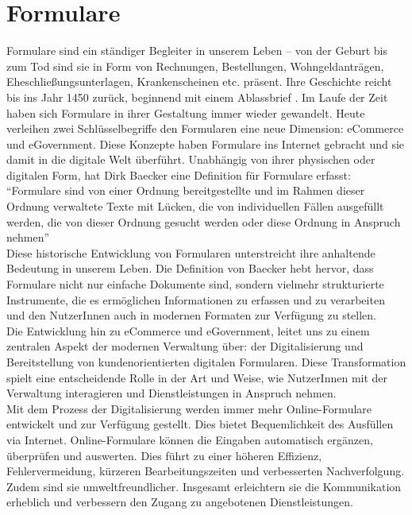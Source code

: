 \section{Formulare}

Formulare sind ein ständiger Begleiter in unserem Leben – von der Geburt bis zum Tod sind sie in Form von Rechnungen, Bestellungen, Wohngeldanträgen, Eheschließungsunterlagen, Krankenscheinen etc. präsent. Ihre Geschichte reicht bis ins Jahr 1450 zurück, beginnend mit einem Ablassbrief \citep{formulare_schwesinger_2007}. Im Laufe der Zeit haben sich Formulare in ihrer Gestaltung immer wieder gewandelt. Heute verleihen zwei Schlüsselbegriffe den Formularen eine neue Dimension: eCommerce und eGovernment. Diese Konzepte haben Formulare ins Internet gebracht und sie damit in die digitale Welt überführt. Unabhängig von ihrer physischen oder digitalen Form, hat Dirk Baecker \citep[S. ~3]{plener_formular_2021} eine Definition für Formulare erfasst: ``Formulare sind von einer Ordnung bereitgestellte und im Rahmen dieser Ordnung verwaltete Texte mit Lücken, die von individuellen Fällen ausgefüllt werden, die von dieser Ordnung gesucht werden oder diese Ordnung in Anspruch nehmen'' \\

Diese historische Entwicklung von Formularen unterstreicht ihre anhaltende Bedeutung in unserem Leben. Die Definition von Baecker hebt hervor, dass Formulare nicht nur einfache Dokumente sind, sondern vielmehr strukturierte Instrumente, die es ermöglichen Informationen zu erfassen und zu verarbeiten und den NutzerInnen auch in modernen Formaten zur Verfügung zu stellen.\\

Die Entwicklung hin zu eCommerce und eGovernment, leitet uns zu einem zentralen Aspekt der modernen Verwaltung über: der Digitalisierung und Bereitstellung von kundenorientierten digitalen Formularen. Diese Transformation spielt eine entscheidende Rolle in der Art und Weise, wie NutzerInnen mit der Verwaltung interagieren und Dienstleistungen in Anspruch nehmen.\\

Mit dem Prozess der Digitalisierung werden immer mehr Online-Formulare entwickelt und zur Verfügung gestellt. Dies bietet Bequemlichkeit des Ausfüllen via Internet. Online-Formulare können die Eingaben automatisch ergänzen, überprüfen und auswerten. Dies führt zu einer höheren Effizienz, Fehlervermeidung, kürzeren Bearbeitungszeiten und verbesserten Nachverfolgung. Zudem sind sie umweltfreundlicher. Insgesamt erleichtern sie die Kommunikation erheblich und verbessern den Zugang zu angebotenen Dienstleistungen.\\


